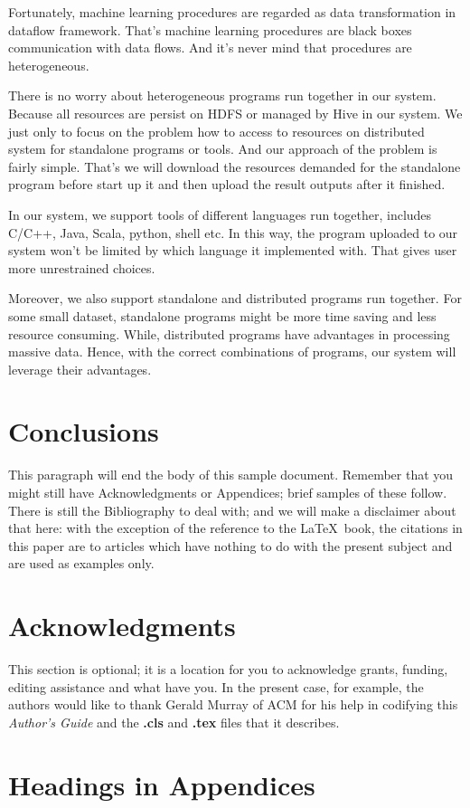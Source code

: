 \documentclass{sig-alternate-05-2015}
\begin{document}
Fortunately, machine learning procedures are regarded as data transformation in dataflow framework. That's machine learning procedures are black boxes communication with data flows. And it's never mind that procedures are heterogeneous.

There is no worry about heterogeneous programs run together in our system. Because all resources are persist on HDFS or managed by Hive in our system. We just only to focus on the problem how to access to resources on distributed system for standalone programs or tools. And our approach of the problem is fairly simple. That's we will download the resources demanded for the standalone program before start up it and then upload the result outputs after it finished.

In our system, we support tools of different languages run together, includes C/C++, Java, Scala, python, shell etc. In this way, the program uploaded to our system won't be limited by which language it implemented with. That gives user more unrestrained choices.

Moreover, we also support standalone and distributed programs run together. For some small dataset, standalone programs might be more time saving and less resource consuming. While, distributed programs have advantages in processing massive data. Hence, with the correct combinations of programs, our system will leverage their advantages.

\section{Conclusions}
This paragraph will end the body of this sample document.
Remember that you might still have Acknowledgments or
Appendices; brief samples of these
follow.  There is still the Bibliography to deal with; and
we will make a disclaimer about that here: with the exception
of the reference to the \LaTeX\ book, the citations in
this paper are to articles which have nothing to
do with the present subject and are used as
examples only.

\section{Acknowledgments}
This section is optional; it is a location for you
to acknowledge grants, funding, editing assistance and
what have you.  In the present case, for example, the
authors would like to thank Gerald Murray of ACM for
his help in codifying this \textit{Author's Guide}
and the \textbf{.cls} and \textbf{.tex} files that it describes.

\appendix
\section{Headings in Appendices}
\end{document}
